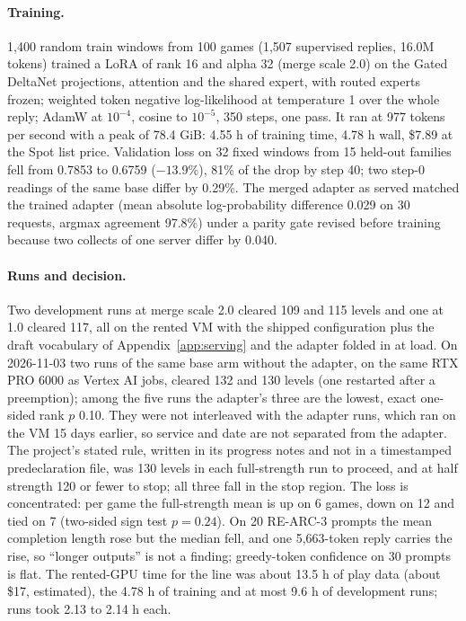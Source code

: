 \paragraph{Training.}
1,400 random train windows from 100 games (1,507 supervised replies, 16.0M tokens) trained a LoRA of rank 16 and alpha 32 (merge scale 2.0) on the Gated DeltaNet projections, attention and the shared expert, with routed experts frozen; weighted token negative log-likelihood at temperature 1 over the whole reply; AdamW at $10^{-4}$, cosine to $10^{-5}$, 350 steps, one pass. %
It ran at 977 tokens per second with a peak of 78.4 GiB: 4.55 h of training time, 4.78 h wall, \$7.89 at the Spot list price. %
Validation loss on 32 fixed windows from 15 held-out families fell from 0.7853 to 0.6759 ($-13.9\%$), 81\% of the drop by step 40; two step-0 readings of the same base differ by 0.29\%. %
The merged adapter as served matched the trained adapter (mean absolute log-probability difference 0.029 on 30 requests, argmax agreement 97.8\%) under a parity gate revised before training because two collects of one server differ by 0.040. %

\paragraph{Runs and decision.}
Two development runs at merge scale 2.0 cleared 109 and 115 levels and one at 1.0 cleared 117, all on the rented VM with the shipped configuration plus the draft vocabulary of Appendix~\ref{app:serving} and the adapter folded in at load. %
On 2026-11-03 two runs of the same base arm without the adapter, on the same RTX PRO 6000 as Vertex AI jobs, cleared 132 and 130 levels (one restarted after a preemption); among the five runs the adapter's three are the lowest, exact one-sided rank $p$ 0.10. They were not interleaved with the adapter runs, which ran on the VM 15 days earlier, so service and date are not separated from the adapter. %
The project's stated rule, written in its progress notes and not in a timestamped predeclaration file, was 130 levels in each full-strength run to proceed, and at half strength 120 or fewer to stop; all three fall in the stop region. %
The loss is concentrated: per game the full-strength mean is up on 6 games, down on 12 and tied on 7 (two-sided sign test $p = 0.24$). %
On 20 RE-ARC-3 prompts the mean completion length rose but the median fell, and one 5,663-token reply carries the rise, so ``longer outputs'' is not a finding; greedy-token confidence on 30 prompts is flat. %
The rented-GPU time for the line was about 13.5 h of play data (about \$17, estimated), the 4.78 h of training and at most 9.6 h of development runs; runs took 2.13 to 2.14 h each. %

